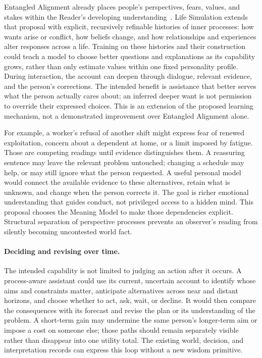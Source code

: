 \documentclass[10pt]{article}
\begin{document}
Entangled Alignment already places people's perspectives, fears, values, and
stakes within the Reader's developing understanding~\cite{westerbergEntangled2026}.
Life Simulation extends that proposal with explicit, recursively refinable
histories of inner processes: how wants arise or conflict, how beliefs change,
and how relationships and experiences alter responses across a life. Training
on these histories and their construction could teach a model to choose better
questions and explanations as its capability grows, rather than only estimate
values within one fixed personality profile. During interaction, the account
can deepen through dialogue, relevant evidence, and the person's corrections.
The intended benefit is assistance that better serves what the person actually
cares about; an inferred deeper want is not permission to override their
expressed choices. This is an extension of the proposed learning mechanism,
not a demonstrated improvement over Entangled Alignment alone.

For example, a worker's refusal of another shift might express fear of renewed
exploitation, concern about a dependent at home, or a limit imposed by fatigue.
Those are competing readings until evidence distinguishes them. A reassuring
sentence may leave the relevant problem untouched; changing a schedule may
help, or may still ignore what the person requested. A useful personal model
would connect the available evidence to these alternatives, retain what is
unknown, and change when the person corrects it. The goal is richer emotional
understanding that guides conduct, not privileged access to a hidden mind.
This proposal chooses the Meaning Model to make those dependencies explicit. Structural separation of perspective processes prevents an
observer's reading from silently becoming uncontested world fact.

\paragraph{Deciding and revising over time.}
The intended capability is not limited to judging an action after it occurs.
A process-aware assistant could use its current, uncertain account to identify
whose aims and constraints matter, anticipate alternatives across near and
distant horizons, and choose whether to act, ask, wait, or decline. It would
then compare the consequences with its forecast and revise the plan or its
understanding of the problem. A short-term gain may undermine the same
person's longer-term aim or impose a cost on someone else; those paths should
remain separately visible rather than disappear into one utility total. The
existing world, decision, and interpretation records can express this loop
without a new wisdom primitive.
\end{document}
